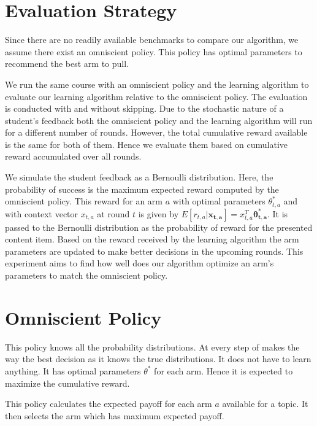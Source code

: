 \section{Evaluation Strategy \label{chap5:evaluationStrategy}}

Since there are no readily available benchmarks to compare our algorithm, we assume there exist an omniscient policy. This policy has optimal parameters to recommend the best arm to pull.  \par

We run the same course with an omniscient policy and the learning algorithm to evaluate our learning algorithm relative to the omniscient policy. The evaluation is conducted with and without skipping. Due to the stochastic nature of a student's feedback both the omniscient policy and the learning algorithm will run for a different number of rounds. However, the total cumulative reward available is the same for both of them. Hence we evaluate them based on cumulative reward accumulated over all rounds. \par 

We simulate the student feedback as a Bernoulli distribution. Here, the probability of success is the maximum expected reward computed by the omniscient policy. This reward for an arm $a$ with optimal parameters $\theta^{*}_{t,a}$ and with context vector $x_{t,a}$ at round $t$ is given by $E[r_{t,a}|\mathbf{x_{t,a}}] = x^{T}_{t,a}\mathbf{\theta^{*}_{t,a}}$. It is passed to the Bernoulli distribution as the probability of reward for the presented content item. Based on the reward received by the learning algorithm the arm parameters are updated to make better decisions in the upcoming rounds. This experiment aims to find how well does our algorithm optimize an arm's parameters to match the omniscient policy. \par

\section{Omniscient Policy \label{chap5:omniscientPolicy}}

This policy knows all the probability distributions. At every step of makes the way the best decision as it knows the true distributions. It does not have to learn anything. It has optimal parameters $\theta^*$ for each arm. Hence it is expected to maximize the cumulative reward.

This policy calculates the expected payoff for each arm $a$ available for a topic. It then selects the arm which has maximum expected payoff. 

